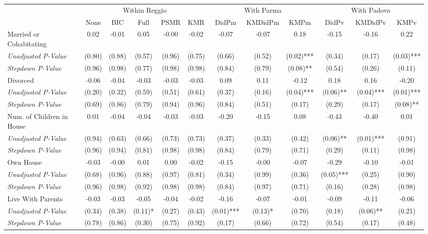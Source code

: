 \begin{tabular}{l c c c c c c c c c c c}
\toprule
& \multicolumn{5}{c}{Within Reggio} & \multicolumn{3}{c}{With Parma} & \multicolumn{3}{c}{With Padova} \\\cmidrule(lr){2-6} \cmidrule(lr){7-9} \cmidrule(lr){10-12}
 & None & BIC & Full & PSMR & KMR & DidPm & KMDidPm & KMPm & DidPv & KMDidPv & KMPv \\
\midrule
Married or Cohabitating & 0.02 & -0.01 & 0.05 & -0.00 & -0.02 & -0.07 & -0.07 & 0.18 & -0.15 & -0.16 & 0.22 \\
\quad \textit{Unadjusted P-Value} & (0.80) & (0.88) & (0.57) & (0.96) & (0.75) & (0.66) & (0.52) & (0.02)*** & (0.34) & (0.17) & (0.03)*** \\
\quad \textit{Stepdown P-Value} & (0.96) & (0.98) & (0.77) & (0.98) & (0.98) & (0.84) & (0.79) & (0.08)** & (0.54) & (0.26) & (0.11) \\
Divorced & -0.06 & -0.04 & -0.03 & -0.03 & -0.03 & 0.09 & 0.11 & -0.12 & 0.18 & 0.16 & -0.20 \\
\quad \textit{Unadjusted P-Value} & (0.20) & (0.32) & (0.59) & (0.51) & (0.61) & (0.37) & (0.16) & (0.04)*** & (0.06)** & (0.04)*** & (0.01)*** \\
\quad \textit{Stepdown P-Value} & (0.69) & (0.86) & (0.79) & (0.94) & (0.96) & (0.84) & (0.51) & (0.17) & (0.29) & (0.17) & (0.08)** \\
Num. of Children in House & 0.01 & -0.04 & -0.04 & -0.03 & -0.03 & -0.20 & -0.15 & 0.08 & -0.43 & -0.40 & 0.01 \\
\quad \textit{Unadjusted P-Value} & (0.94) & (0.63) & (0.66) & (0.73) & (0.73) & (0.37) & (0.33) & (0.42) & (0.06)** & (0.01)*** & (0.91) \\
\quad \textit{Stepdown P-Value} & (0.96) & (0.94) & (0.81) & (0.98) & (0.98) & (0.84) & (0.79) & (0.71) & (0.29) & (0.11) & (0.98) \\
Own House & -0.03 & -0.00 & 0.01 & 0.00 & -0.02 & -0.15 & -0.00 & -0.07 & -0.29 & -0.10 & -0.01 \\
\quad \textit{Unadjusted P-Value} & (0.68) & (0.96) & (0.88) & (0.97) & (0.81) & (0.34) & (0.99) & (0.36) & (0.05)*** & (0.25) & (0.90) \\
\quad \textit{Stepdown P-Value} & (0.96) & (0.98) & (0.92) & (0.98) & (0.98) & (0.84) & (0.97) & (0.71) & (0.16) & (0.28) & (0.98) \\
Live With Parents & -0.03 & -0.03 & -0.05 & -0.04 & -0.02 & -0.16 & -0.07 & -0.01 & -0.09 & -0.11 & -0.06 \\
\quad \textit{Unadjusted P-Value} & (0.34) & (0.38) & (0.11)* & (0.27) & (0.43) & (0.01)*** & (0.13)* & (0.70) & (0.18) & (0.06)** & (0.21) \\
\quad \textit{Stepdown P-Value} & (0.78) & (0.86) & (0.30) & (0.75) & (0.92) & (0.17) & (0.66) & (0.72) & (0.54) & (0.17) & (0.48) \\
\bottomrule
\end{tabular}
